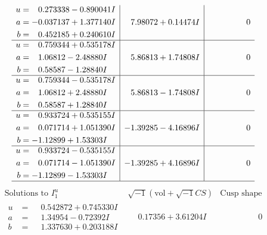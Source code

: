 \documentclass[1p]{elsarticle_modified}
\theoremstyle{definition}
\newcommand{\I}{\sqrt{-1}}
\begin{document}
$$\begin{array}{c|c|c}
\begin{aligned}
u &= \phantom{-}0.273338 - 0.890041 I \\
a &= -0.037137 + 1.377140 I \\
b &= \phantom{-}0.452185 + 0.240610 I\end{aligned}
 & \phantom{-}7.98072 + 0.14474 I & \phantom{-0.000000 } 0 \\ \hline\begin{aligned}
u &= \phantom{-}0.759344 + 0.535178 I \\
a &= \phantom{-}1.06812 - 2.48880 I \\
b &= \phantom{-}0.58587 - 1.28840 I\end{aligned}
 & \phantom{-}5.86813 + 1.74808 I & \phantom{-0.000000 } 0 \\ \hline\begin{aligned}
u &= \phantom{-}0.759344 - 0.535178 I \\
a &= \phantom{-}1.06812 + 2.48880 I \\
b &= \phantom{-}0.58587 + 1.28840 I\end{aligned}
 & \phantom{-}5.86813 - 1.74808 I & \phantom{-0.000000 } 0 \\ \hline\begin{aligned}
u &= \phantom{-}0.933724 + 0.535155 I \\
a &= \phantom{-}0.071714 + 1.051390 I \\
b &= -1.12899 + 1.53303 I\end{aligned}
 & -1.39285 - 4.16896 I & \phantom{-0.000000 } 0 \\ \hline\begin{aligned}
u &= \phantom{-}0.933724 - 0.535155 I \\
a &= \phantom{-}0.071714 - 1.051390 I \\
b &= -1.12899 - 1.53303 I\end{aligned}
 & -1.39285 + 4.16896 I & \phantom{-0.000000 } 0\\
 \hline 
 \end{array}$$\newpage$$\begin{array}{c|c|c}  
\text{Solutions to }I^u_{1}& \I (\text{vol} + \sqrt{-1}CS) & \text{Cusp shape}\\
 \hline 
\begin{aligned}
u &= \phantom{-}0.542872 + 0.745330 I \\
a &= \phantom{-}1.34954 - 0.72392 I \\
b &= \phantom{-}1.337630 + 0.203188 I\end{aligned}
 & \phantom{-}0.17356 + 3.61204 I & \phantom{-0.000000 } 0 \\ \hline\begin{aligned}

\end{aligned}
\end{array}$$
\end{document}
